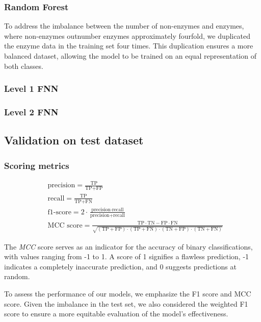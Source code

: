 \documentclass{bioinfo}
\begin{document}
\begin{methods}
\subsubsection{Random Forest}
To address the imbalance between the number of non-enzymes and enzymes, where non-enzymes outnumber enzymes approximately fourfold,
we duplicated the enzyme data in the training set four times.
This duplication ensures a more balanced dataset, allowing the model to be trained on an equal representation of both classes.

\subsubsection{Level 1 FNN}
\subsubsection{Level 2 FNN}


\subsection{Validation on test dataset}

\subsubsection{Scoring metrics}



\begin{align}
	&\text{precision} = \frac{\text{TP}}{\text{TP} + \text{FP}} \\
    &\text{recall} = \frac{\text{TP}}{\text{TP} + \text{FN}} \\
    &\text{f1-score} = 2 \cdot \frac{\text{precision} \cdot \text{recall}}{\text{precision} + \text{recall}} \\
    &\text{MCC score} = \frac{\text{TP} \cdot \text{TN} - \text{FP} \cdot \text{FN}}{\sqrt{(\text{TP} + \text{FP}) \cdot (\text{TP} + \text{FN}) \cdot (\text{TN} + \text{FP}) \cdot (\text{TN} + \text{FN})}}
\end{align}

The \textit{MCC} score serves as an indicator for the accuracy of binary classifications, with values ranging from -1 to 1. A score of 1 signifies a flawless prediction, 
-1 indicates a completely inaccurate prediction, and 0 suggests predictions at random.  

To assess the performance of our models, we emphasize the F1 score and MCC score. 
Given the imbalance in the test set, we also considered the weighted F1 score to ensure a more equitable evaluation of the model's 
effectiveness.

\end{methods}
\end{document}
